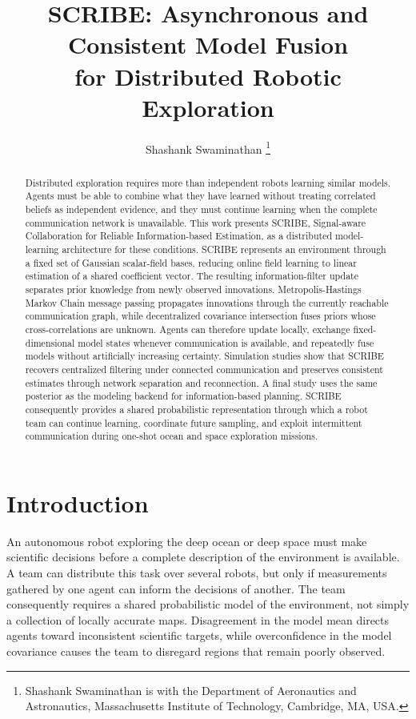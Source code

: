 \documentclass[letterpaper,10pt,conference]{ieeeconf}
\title{\LARGE \bf
SCRIBE: Asynchronous and Consistent Model Fusion\\
for Distributed Robotic Exploration
}
\author{Shashank Swaminathan%
\thanks{Shashank Swaminathan is with the Department of Aeronautics and
Astronautics, Massachusetts Institute of Technology, Cambridge, MA, USA.}}
\begin{document}
\maketitle
\thispagestyle{empty}
\pagestyle{empty}

\begin{abstract}
Distributed exploration requires more than independent robots learning
similar models. Agents must be able to combine what they have learned without
treating correlated beliefs as independent evidence, and they must continue
learning when the complete communication network is unavailable. This work
presents SCRIBE, Signal-aware Collaboration for Reliable Information-based
Estimation, as a distributed model-learning architecture for these conditions.
SCRIBE represents an environment through a fixed set of Gaussian scalar-field
bases, reducing online field learning to linear estimation of a shared
coefficient vector. The resulting information-filter update separates prior
knowledge from newly observed innovations. Metropolis-Hastings Markov Chain
message passing propagates innovations through the currently reachable
communication graph, while decentralized covariance intersection fuses priors
whose cross-correlations are unknown. Agents can therefore update locally,
exchange fixed-dimensional model states whenever communication is available,
and repeatedly fuse models without artificially increasing certainty.
Simulation studies show that SCRIBE recovers centralized filtering under
connected communication and preserves consistent estimates through network
separation and reconnection. A final study uses the same posterior as the
modeling backend for information-based planning. SCRIBE consequently provides
a shared probabilistic representation through which a robot team can continue
learning, coordinate future sampling, and exploit intermittent communication
during one-shot ocean and space exploration missions.
\end{abstract}

\section{Introduction}

An autonomous robot exploring the deep ocean or deep space must make
scientific decisions before a complete description of the environment is
available. A team can distribute this task over several robots, but only if
measurements gathered by one agent can inform the decisions of another. The
team consequently requires a shared probabilistic model of the environment,
not simply a collection of locally accurate maps. Disagreement in the model
mean directs agents toward inconsistent scientific targets, while
overconfidence in the model covariance causes the team to disregard regions
that remain poorly observed.
\end{document}
